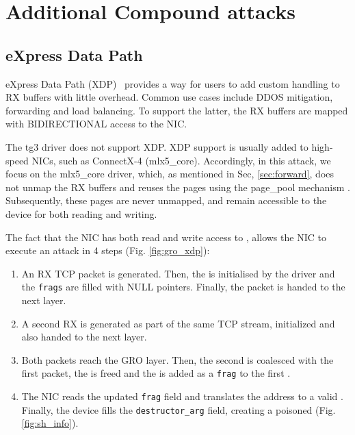 \clearpage
\section{Additional Compound attacks}\label{appx:additional_compound}

\subsection{eXpress Data Path}\label{sec:xdp}

eXpress Data Path (XDP)~\cite{xdp} provides a way for users to add custom handling to RX buffers with little overhead. Common use cases include DDOS mitigation, forwarding and load balancing. To support the latter, the RX buffers are mapped with BIDIRECTIONAL access to the NIC. 

The tg3 driver does not support XDP. XDP support is usually added to high-speed NICs, such as ConnectX-4 (mlx5\_core). Accordingly, in this attack, we focus on the mlx5\_core driver, which, as mentioned in Sec, \ref{sec:forward}, does not unmap the RX buffers and reuses the pages using the page\_pool mechanism \cite{page_pool}. Subsequently, these pages are never unmapped, and remain accessible to the device for both reading and writing. 

The fact that the NIC has both read and write access to \shinfo, allows the NIC to execute an attack in 4 steps (Fig. \ref{fig:gro_xdp}):
\begin{enumerate}
    \item An RX TCP packet is generated. Then, the \shinfo{} is initialised by the driver and the \texttt{frags} are filled with NULL pointers. Finally, the packet is handed to the next layer.
    
    \item A second RX \skb{} is generated as part of the same TCP stream, initialized and also handed to the next layer.
    
    \item Both packets reach the GRO layer. Then, the second \skb{} is coalesced with the first packet, the \skb{} is freed and the \data{} is added as a \texttt{frag} to the first \skb.
    
    \item The NIC reads the updated \texttt{frag} field and translates the \page{} address to a valid \kva{}. Finally, the device fills the \texttt{destructor\_arg} field, creating a poisoned \skb{} (Fig. \ref{fig:sh_info}).
\end{enumerate}


